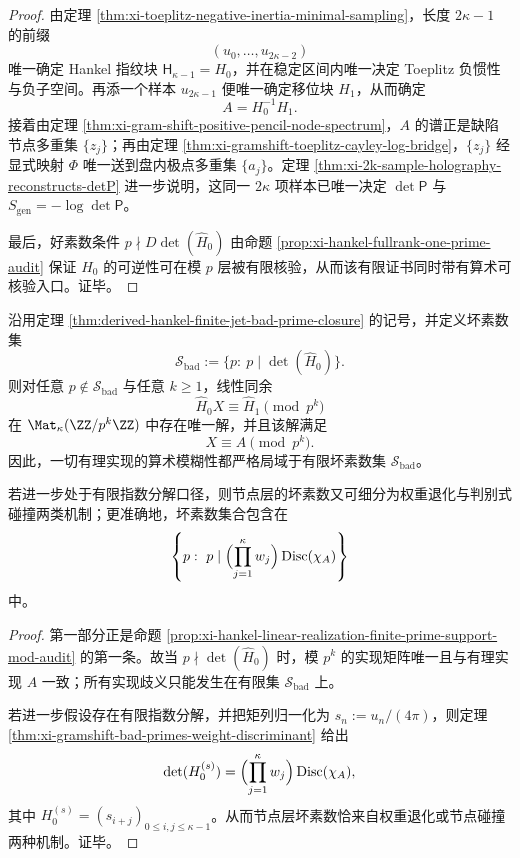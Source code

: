 \begin{proof}
由定理 \ref{thm:xi-toeplitz-negative-inertia-minimal-sampling}，长度 \(2\kappa-1\) 的前缀
\[
(u_0,\dots,u_{2\kappa-2})
\]
唯一确定 Hankel 指纹块 \(\mathsf H_{\kappa-1}=H_0\)，并在稳定区间内唯一决定 Toeplitz 负惯性与负子空间。再添一个样本 \(u_{2\kappa-1}\) 便唯一确定移位块 \(H_1\)，从而确定
\[
A=H_0^{-1}H_1.
\]
接着由定理 \ref{thm:xi-gram-shift-positive-pencil-node-spectrum}，\(A\) 的谱正是缺陷节点多重集 \(\{z_j\}\)；再由定理 \ref{thm:xi-gramshift-toeplitz-cayley-log-bridge}，\(\{z_j\}\) 经显式映射 \(\Phi\) 唯一送到盘内极点多重集 \(\{a_j\}\)。定理 \ref{thm:xi-2k-sample-holography-reconstructs-detP} 进一步说明，这同一 \(2\kappa\) 项样本已唯一决定 \(\det\mathsf P\) 与
\(
S_{\mathrm{gen}}=-\log\det\mathsf P
\)。

最后，好素数条件 \(p\nmid D\det(\widehat H_0)\) 由命题 \ref{prop:xi-hankel-fullrank-one-prime-audit} 保证 \(H_0\) 的可逆性可在模 \(p\) 层被有限核验，从而该有限证书同时带有算术可核验入口。证毕。
\end{proof}

\begin{corollary}[算术模糊性的有限坏素局域化]\label{cor:derived-hankel-arithmetic-ambiguity-localizes-bad-primes}
沿用定理 \ref{thm:derived-hankel-finite-jet-bad-prime-closure} 的记号，并定义坏素数集
\[
\mathcal S_{\mathrm{bad}}
:=
\{p:\ p\mid \det(\widehat H_0)\}.
\]
则对任意 \(p\notin \mathcal S_{\mathrm{bad}}\) 与任意 \(k\ge 1\)，线性同余
\[
\widehat H_0X\equiv \widehat H_1\pmod{p^k}
\]
在 \(\Mat_\kappa(\ZZ/p^k\ZZ)\) 中存在唯一解，并且该解满足
\[
X\equiv A\pmod{p^k}.
\]
因此，一切有理实现的算术模糊性都严格局域于有限坏素数集 \(\mathcal S_{\mathrm{bad}}\)。

若进一步处于有限指数分解口径，则节点层的坏素数又可细分为权重退化与判别式碰撞两类机制；更准确地，坏素数集合包含在
\[
\left\{p:\ p\mid \Bigl(\prod_{j=1}^{\kappa}w_j\Bigr)\operatorname{Disc}(\chi_A)\right\}
\]
中。
\end{corollary}

\begin{proof}
第一部分正是命题 \ref{prop:xi-hankel-linear-realization-finite-prime-support-mod-audit} 的第一条。故当 \(p\nmid \det(\widehat H_0)\) 时，模 \(p^k\) 的实现矩阵唯一且与有理实现 \(A\) 一致；所有实现歧义只能发生在有限集 \(\mathcal S_{\mathrm{bad}}\) 上。

若进一步假设存在有限指数分解，并把矩列归一化为 \(s_n:=u_n/(4\pi)\)，则定理 \ref{thm:xi-gramshift-bad-primes-weight-discriminant} 给出
\[
\det(H_0^{(s)})
=
\Bigl(\prod_{j=1}^{\kappa}w_j\Bigr)\operatorname{Disc}(\chi_A),
\]
其中 \(H_0^{(s)}=(s_{i+j})_{0\le i,j\le \kappa-1}\)。从而节点层坏素数恰来自权重退化或节点碰撞两种机制。证毕。
\end{proof}

